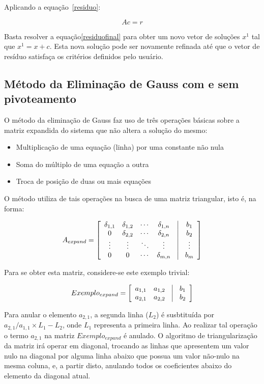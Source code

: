 \documentclass[a4paper,10pt]{report}
\begin{document}
Aplicando a equação~\ref{residuo}:

\begin{equation}
Ac = r
\label{residuofinal}
\end{equation}

Basta resolver a equação\ref{residuofinal} para obter um novo vetor de soluções $x^{1}$ tal que $x^{1} = x + c$. Esta nova solução pode ser novamente refinada até que o vetor de resíduo satisfaça os critérios definidos pelo usuário.

\subsection{Método da Eliminação de Gauss com e sem pivoteamento}

O método da eliminação de Gauss faz uso de três operações básicas sobre a matriz expandida do sistema que não altera a solução do mesmo:

\begin{itemize}
 \item Multiplicação de uma equação (linha) por uma constante não nula
 \item Soma do múltiplo de uma equação a outra
 \item Troca de posição de duas ou mais equações
\end{itemize}

O método utiliza de tais operações na busca de uma matriz triangular, isto é, na forma:

\[
A_{expand} = \left[ \begin{array}{cccccc}
\delta_{1,1} & \delta_{1,2} & \cdots & \delta_{1,n} & \vline & b_{1} \\
0 & \delta_{2,2} & \cdots & \delta_{2,n} & \vline & b_{2} \\
\vdots  & \vdots & \ddots & \vdots & \vline & \vdots \\
0 & 0 & \cdots & \delta_{m,n} & \vline & b_{m} 
\end{array}\right]
\]

Para se obter esta matriz, considere-se este exemplo trivial:

\[
Exemplo_{expand} = \left[ \begin{array}{cccc}
a_{1,1} & a_{1,2} & \vline & b_{1} \\
a_{2,1} & a_{2,2} & \vline & b_{2}
\end{array}\right]
\]

Para anular o elemento $a_{2,1}$, a segunda linha ($L_{2}$) é susbtituída por $a_{2,1}/a_{1,1} \times L_{1} - L_{2}$, onde $L_{1}$ representa a primeira linha. Ao realizar tal operação o termo $a_{2,1}$ na matriz  $Exemplo_{expand}$ é anulado. O algoritmo de triangularização da matriz irá operar em diagonal, trocando as linhas que apresentem um valor nulo na diagonal por alguma linha abaixo que possua um valor não-nulo na mesma coluna, e, a partir disto, anulando todos os coeficientes abaixo do elemento da diagonal atual.
\end{document}
